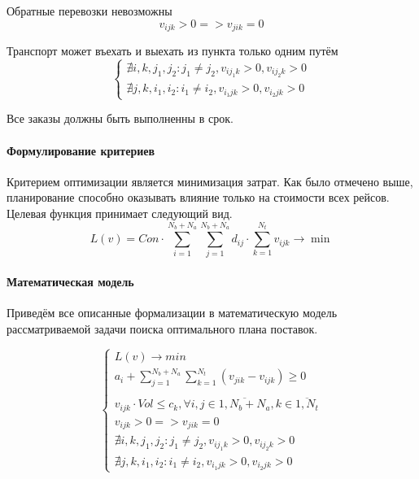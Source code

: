 	Обратные перевозки невозможны
	\begin{equation}
		v_{ijk} > 0 => v_{jik} = 0
	\end{equation}

	Транспорт может въехать и выехать из пункта только одним путём
	\begin{equation}
		\left\{
		\begin{array}{ccc}
			\nexists i, k, j_1, j_2: j_1 \ne j_2, v_{ij_1k} > 0, v_{ij_2k} > 0 \\
			\nexists j, k, i_1, i_2: i_1 \ne i_2, v_{i_1jk} > 0, v_{i_2jk} > 0 
		\end{array}
		\right.
	\end{equation}

	Все заказы должны быть выполненны в срок.	
	
	\paragraph{Формулирование критериев}   
	Критерием оптимизации является минимизация затрат. Как было отмечено выше, планирование способно оказывать влияние только на стоимости всех рейсов. Целевая функция принимает следующий вид.
	\begin{equation}
		L(v) = Con \cdot \sum_{i=1}^{N_b+N_a} \sum_{j=1}^{N_b+N_a} d_{ij} \cdot \sum_{k=1}^{N_t} v_{ijk} \to \min
	\end{equation}

	\paragraph{Математическая модель}
	Приведём все описанные формализации в математическую модель рассматриваемой задачи поиска оптимального плана поставок.

	\begin{equation}
	\left\{ \begin{array}{ccc}	
		L(v) \to min \\
		a_i + \sum_{j=1}^{N_b+N_a} \sum_{k=1}^{N_t} (v_{jik} - v_{ijk}) \ge 0 \\
		\\
		v_{ijk} \cdot Vol \le c_k, \forall i, j \in 
		\overline{1, N_b+N_a}, k \in \overline{1, N_t} \\
		v_{ijk} > 0 => v_{jik} = 0 \\
		\nexists i, k, j_1, j_2: j_1 \ne j_2, v_{ij_1k} > 0, v_{ij_2k} > 0 \\
		\nexists j, k, i_1, i_2: i_1 \ne i_2, v_{i_1jk} > 0, v_{i_2jk} > 0 
	\end{array}
	\right.
	\end{equation}

